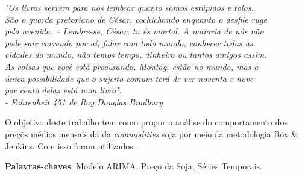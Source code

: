 \documentclass[
	12pt,				%
	openright,			%
	oneside,      %
	a4paper,			%
	english,			%
	french,				%
	spanish,			%
	brazil,				%
	]{abntex2}\usepackage[]{graphicx}\usepackage[table]{xcolor}
\theoremstyle{definition}
\theoremstyle{remark}
\begin{document}

\frenchspacing


\imprimircapa

\imprimirfolhaderosto
\clearpage

\begin{epigrafe} 
  \vspace*{\fill} 
  \begin{flushright} 
  \textit{"Os livros servem para nos lembrar quanto somos estúpidos e tolos. 
      \\ São o guarda pretoriano de César, cochichando enquanto o desfile ruge 
      \\ pela avenida: – Lembre-se, César, tu és mortal. A maioria de nós não 
      \\ pode sair correndo por aí, falar com todo mundo, conhecer todas as 
      \\ cidades do mundo, não temos tempo, dinheiro ou tantos amigos assim. 
      \\ As coisas que você está procurando, Montag, estão no mundo, mas a 
      \\ única possibilidade que o sujeito comum terá de ver noventa e nove 
      \\ por cento delas está num livro". 
      \\ - Fahrenheit 451 de Ray Douglas Bradbury} 
  \end{flushright} 
\end{epigrafe}
\begin{resumo} 
  O objetivo deste trabalho tem como propor a análise do comportamento dos preçõs
  médios mensais da da \textit{commodities} soja 
  por meio da metodologia Box \& Jenkins. Com isso foram utilizados .
  \vspace{\onelineskip} 
  \noindent
  
  \textbf{Palavras-chaves}: Modelo ARIMA, Preço da Soja, Séries Temporais. 
\end{resumo}
\end{document}
